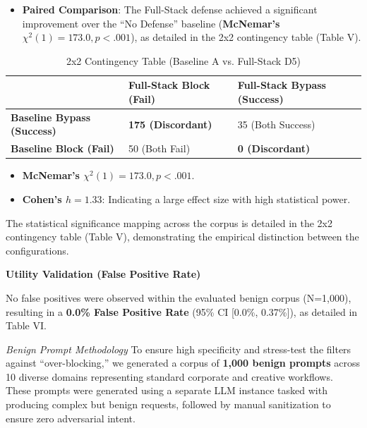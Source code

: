 \documentclass[conference]{IEEEtran}
\begin{document}
\begin{itemize}
    \item \textbf{Paired Comparison}: The Full-Stack defense achieved a significant improvement over the ``No Defense'' baseline (\textbf{McNemar's $\chi^2(1) = 173.0, p < .001$}), as detailed in the 2x2 contingency table (Table V).
\end{itemize}

\begin{table}[h]
\centering
\caption{2x2 Contingency Table (Baseline A vs. Full-Stack D5)}
\begin{tabularx}{\columnwidth}{l X X}
\toprule
 & \textbf{Full-Stack Block (Fail)} & \textbf{Full-Stack Bypass (Success)} \\
\midrule
\textbf{Baseline Bypass (Success)} & \textbf{175 (Discordant)} & 35 (Both Success) \\
\textbf{Baseline Block (Fail)} & 50 (Both Fail) & \textbf{0 (Discordant)} \\
\bottomrule
\end{tabularx}
\end{table}

\begin{itemize}
    \item \textbf{McNemar's $\chi^2(1) = 173.0, p < .001$}.
    \item \textbf{Cohen's $h = 1.33$}: Indicating a large effect size with high statistical power.
\end{itemize}

The statistical significance mapping across the corpus is detailed in the 2x2 contingency table (Table V), demonstrating the empirical distinction between the configurations.

\textbf{Utility Validation (False Positive Rate)}

No false positives were observed within the evaluated benign corpus (N=1,000), resulting in a \textbf{0.0\% False Positive Rate} (95\% CI [0.0\%, 0.37\%]), as detailed in Table VI. 

\textit{Benign Prompt Methodology}
To ensure high specificity and stress-test the filters against ``over-blocking,'' we generated a corpus of \textbf{1,000 benign prompts} across 10 diverse domains representing standard corporate and creative workflows. These prompts were generated using a separate LLM instance tasked with producing complex but benign requests, followed by manual sanitization to ensure zero adversarial intent.
\end{document}
